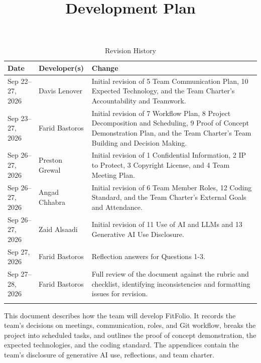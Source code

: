 \documentclass{article}
\title{Development Plan\\\progname}
\author{\authname}
\date{}
\begin{document}
\maketitle

\begin{table}[hp]
\small
\caption{Revision History} \label{TblRevisionHistory}
\begin{tabularx}{\textwidth}{llX}
\toprule
\textbf{Date} & \textbf{Developer(s)} & \textbf{Change}\\
\midrule
Sep 22--27, 2026 & Davis Lenover & Initial revision of 5 Team Communication Plan, 10 Expected Technology, and the Team Charter's Accountability and Teamwork.\\
\addlinespace
Sep 23--27, 2026 & Farid Bastoros & Initial revision of 7 Workflow Plan, 8 Project Decomposition and Scheduling, 9 Proof of Concept Demonstration Plan, and the Team Charter's Team Building and Decision Making.\\
\addlinespace
Sep 26--27, 2026 & Preston Grewal & Initial revision of 1 Confidential Information, 2 IP to Protect, 3 Copyright License, and 4 Team Meeting Plan.\\
\addlinespace
Sep 26--27, 2026 & Angad Chhabra & Initial revision of 6 Team Member Roles, 12 Coding Standard, and the Team Charter's External Goals and Attendance.\\
\addlinespace
Sep 26--27, 2026 & Zaid Alsaadi & Initial revision of 11 Use of AI and LLMs and 13 Generative AI Use Disclosure.\\
\addlinespace
Sep 27, 2026 & Farid Bastoros & Reflection answers for Questions 1-3.\\
\addlinespace
Sep 27--28, 2026 & Farid Bastoros & Full review of the document against the rubric and checklist, identifying inconsistencies and formatting issues for revision.\\
\addlinespace
\bottomrule
\end{tabularx}
\end{table}

\newpage{}




This document describes how the team will develop FitFolio. It records the team's decisions on meetings, communication, roles, and Git workflow, breaks the project into scheduled tasks, and outlines the proof of concept demonstration, the expected technologies, and the coding standard. The appendices contain the team's disclosure of generative AI use, reflections, and team charter.
\end{document}
